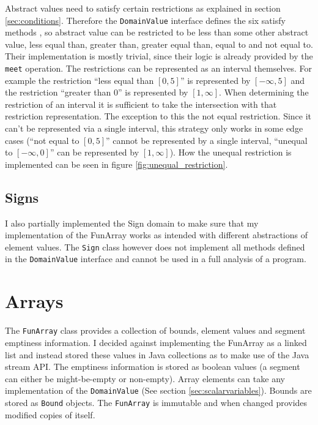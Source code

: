 Abstract values need to satisfy certain restrictions as explained in section \ref{sec:conditions}. Therefore the \texttt{DomainValue} interface defines the six satisfy methods , so abstract value can be restricted to be less than some other abstract value, less equal than, greater than, greater equal than, equal to and not equal to. Their implementation is mostly trivial, since their logic is already provided by the \texttt{meet} operation. The restrictions can be represented as an interval themselves. For example the restriction ``less equal than $[0,5]$'' is represented by $[-\infty,5]$ and the restriction ``greater than $0$'' is represented by $[1,\infty]$. When determining the restriction of an interval it is sufficient to take the intersection with that restriction representation. The exception to this the not equal restriction. Since it can't be represented via a single interval, this strategy only works in some edge cases (``not equal to $[0,5]$'' cannot be represented by a single interval, ``unequal to $[-\infty,0]$'' can be represented by $[1,\infty]$). How the unequal restriction is implemented can be seen in figure \ref{fig:unequal_restriction}.



\subsection{Signs}
I also partially implemented the Sign domain to make sure that my implementation of the FunArray works as intended with different abstractions of element values. The \texttt{Sign} class however does not implement all methods defined in the \texttt{DomainValue} interface and cannot be used in a full analysis of a program.






\section{Arrays}

The \texttt{FunArray} class provides a collection of bounds, element values and segment emptiness information. I decided against implementing the FunArray as a linked list and instead stored these values in Java collections as to make use of the Java stream API. The emptiness information is stored as boolean values (a segment can either be might-be-empty or non-empty). Array elements can take any implementation of the \texttt{DomainValue} (See section \ref{sec:scalarvariables}). Bounds are stored as \texttt{Bound} objects. The \texttt{FunArray} is immutable and when changed provides modified copies of itself.

